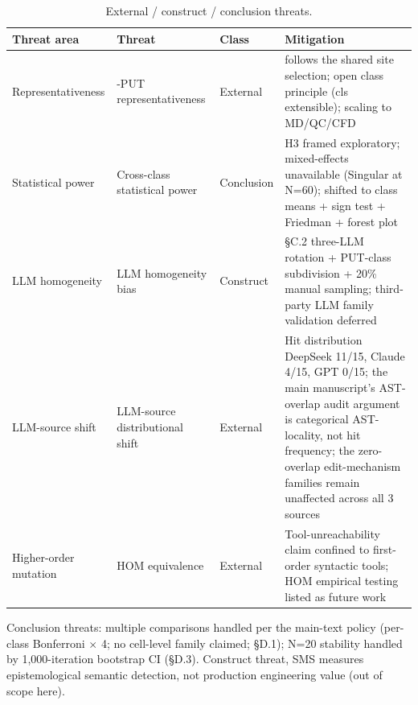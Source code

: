 \documentclass[manuscript,screen,review]{acmart}
\begin{document}
{%
\begin{longtable}[]{@{}
  >{\raggedright\arraybackslash}p{}
  >{\raggedright\arraybackslash}p{}
  >{\raggedright\arraybackslash}p{}
  >{\raggedright\arraybackslash}p{}@{}}
\caption{External / construct / conclusion threats.}\label{tab:p2-28}\\
\toprule\noalign{}
\begin{minipage}[b]{\linewidth}\raggedright
Threat area
\end{minipage} & \begin{minipage}[b]{\linewidth}\raggedright
Threat
\end{minipage} & \begin{minipage}[b]{\linewidth}\raggedright
Class
\end{minipage} & \begin{minipage}[b]{\linewidth}\raggedright
Mitigation
\end{minipage} \\
\midrule\noalign{}
\endfirsthead
\endhead
\bottomrule\noalign{}
\endlastfoot
Representativeness & 12-PUT representativeness & External & follows the shared site selection;
open class principle (cls extensible); scaling to MD/QC/CFD \\
Statistical power & Cross-class statistical power & Conclusion & H3 framed exploratory;
mixed-effects unavailable (Singular at N=60); shifted to class means +
sign test + Friedman + forest plot \\
LLM homogeneity & LLM homogeneity bias & Construct & §C.2 three-LLM rotation +
PUT-class subdivision + 20\% manual sampling; third-party LLM family
validation deferred \\
LLM-source shift & LLM-source distributional shift & External & Hit distribution
DeepSeek 11/15, Claude 4/15, GPT 0/15; the main manuscript's AST-overlap audit argument is categorical
AST-locality, not hit frequency; the zero-overlap edit-mechanism families
remain unaffected across all 3 sources \\
Higher-order mutation & HOM equivalence & External & Tool-unreachability claim confined to
first-order syntactic tools; HOM empirical testing listed as future
work \\
\end{longtable}
}

Conclusion threats: multiple comparisons handled per the main-text
policy (per-class Bonferroni $\times$ 4; no cell-level family claimed;
§D.1); N=20 stability handled by 1,000-iteration
bootstrap CI (§D.3). Construct threat, SMS measures epistemological
semantic detection, not production engineering value (out of scope here).
\end{document}
